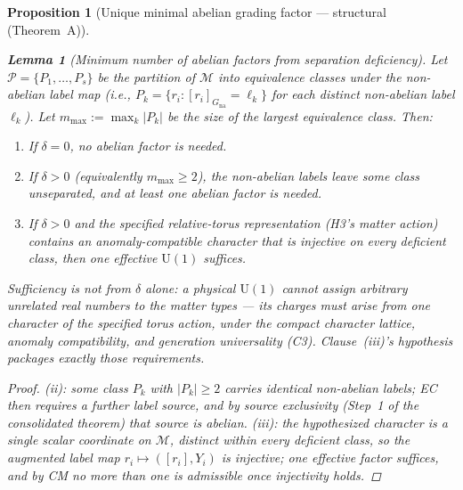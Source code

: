 \documentclass[11pt]{article}
\newtheorem{lemma}[theorem]{Lemma}
\newtheorem{proposition}[theorem]{Proposition}
\theoremstyle{definition}
\newcommand{\U}{\mathrm{U}}
\begin{document}
\begin{proposition}[Unique minimal abelian grading factor ---
structural (Theorem~A)]
\begin{lemma}[Minimum number of abelian factors from separation deficiency]
\label{lem:min_abelian}
Let $\mathcal{P} = \{P_1, \ldots, P_s\}$ be the partition of
$\mathcal{M}$ into equivalence classes under the non-abelian label
map (i.e., $P_k = \{r_i : [r_i]_{G_{\mathrm{na}}} = \ell_k\}$
for each distinct non-abelian label $\ell_k$).  Let
$m_{\max} := \max_k |P_k|$ be the size of the largest equivalence
class.  Then:
\begin{enumerate}[label=(\roman*),nosep]
  \item If $\delta = 0$, no abelian factor is needed.
  \item If $\delta > 0$ (equivalently $m_{\max} \ge 2$), the
  non-abelian labels leave some class unseparated, and at least one
  abelian factor is needed.
  \item If $\delta > 0$ and the specified relative-torus
  representation (H3's matter action) contains an anomaly-compatible
  character that is injective on every deficient class, then one
  effective $\U(1)$ suffices.
\end{enumerate}
Sufficiency is not from $\delta$ alone: a physical $\U(1)$ cannot
assign arbitrary unrelated real numbers to the matter types --- its
charges must arise from one character of the specified torus action,
under the compact character lattice, anomaly compatibility, and
generation universality (C3).  Clause~(iii)'s hypothesis packages
exactly those requirements.
\end{lemma}

\begin{proof}
(ii): some class $P_k$ with $|P_k| \ge 2$ carries identical
non-abelian labels; EC then requires a further label source, and by
source exclusivity (Step~1 of the consolidated theorem) that source is
abelian.  (iii): the hypothesized character is a single scalar
coordinate on $\mathcal{M}$, distinct within every deficient class,
so the augmented label map $r_i \mapsto ([r_i], Y_i)$ is injective;
one effective factor suffices, and by CM no more than one is
admissible once injectivity holds.
\end{proof}


\end{proposition}
\end{document}
